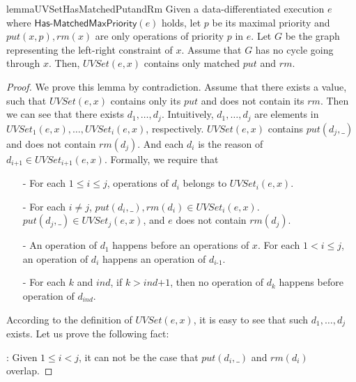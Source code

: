 \begin{restatable}{lemma}{UVSetHasMatchedPutandRm}
\label{lemma:UVSet has matched put and rm}
Given a data-differentiated execution $e$ where $\mathsf{Has\text{-}MatchedMaxPriority}(e)$ holds, let $p$ be its maximal priority and $\textit{put}(x,p),\textit{rm}(x)$ are only operations of priority $p$ in $e$. Let $G$ be the graph representing the left-right constraint of $x$. Assume that $G$ has no cycle going through $x$. Then, $\textit{UVSet}(e,x)$ contains only matched $\textit{put}$ and $\textit{rm}$.
\end{restatable}
\begin {proof}

We prove this lemma by contradiction. Assume that there exists a value, such that $\textit{UVSet}(e,x)$ contains only its $\textit{put}$ and does not contain its $\textit{rm}$. Then we can see that there exists $d_1,\ldots,d_j$. Intuitively, $d_1,\ldots,d_j$ are elements in $\textit{UVSet}_1(e,x), \ldots, \textit{UVSet}_i(e,x)$, respectively. $\textit{UVSet}(e,x)$ contains $\textit{put}(d_j,\_)$ and does not contain $\textit{rm}(d_j)$. And each $d_i$ is the reason of $d_{\textit{i+1}} \in \textit{UVSet}_{\textit{i+1}}(e,x)$. Formally, we require that

\begin{itemize}
\setlength{\itemsep}{0.5pt}
\item[-] For each $1 \leq i \leq j$, operations of $d_i$ belongs to $\textit{UVSet}_i(e,x)$.

\item[-] For each $i \neq j$, $\textit{put}(d_i,\_),\textit{rm}(d_i) \in \textit{UVSet}_i(e,x)$. $\textit{put}(d_j,\_) \in \textit{UVSet}_j(e,x)$, and $e$ does not contain $\textit{rm}(d_j)$.

\item[-] An operation of $d_1$ happens before an operations of $x$. For each $1 < i \leq j$, an operation of $d_i$ happens an operation of $d_{\textit{i-1}}$.

\item[-] For each $k$ and $\textit{ind}$, if $k > \textit{ind+1}$, then no operation of $d_k$ happens before operation of $d_{\textit{ind}}$.
\end{itemize}

According to the definition of $\textit{UVSet}(e,x)$, it is easy to see that such $d_1,\ldots,d_j$ exists. Let us prove the following fact:

: Given $1 \leq i < j$, it can not be the case that $\textit{put}(d_i,\_)$ and $\textit{rm}(d_i)$ overlap.


\end{proof}
